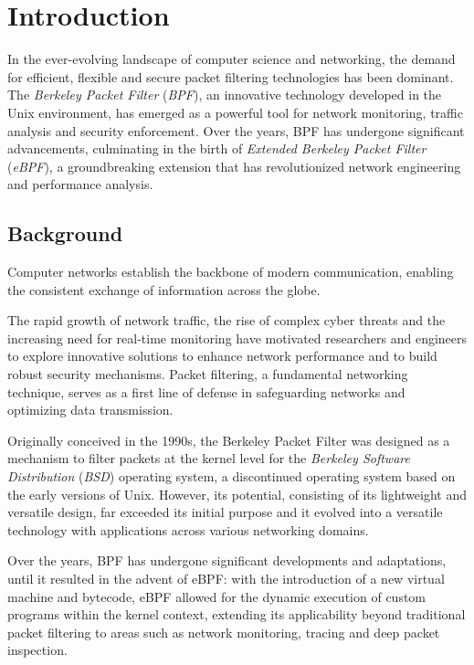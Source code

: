 \chapter{Introduction}

In the ever-evolving landscape of computer science and networking, the demand for efficient, flexible and secure packet filtering technologies has been dominant. 
The \textit{Berkeley Packet Filter} (\textit{BPF}), an innovative technology developed in the Unix environment, has emerged as a powerful tool for network monitoring, traffic analysis and security enforcement. 
Over the years, BPF has undergone significant advancements, culminating in the birth of \textit{Extended Berkeley Packet Filter} (\textit{eBPF}), a groundbreaking extension that has revolutionized network engineering and performance analysis.

\section{Background}

Computer networks establish the backbone of modern communication, enabling the consistent exchange of information across the globe. 

The rapid growth of network traffic, the rise of complex cyber threats and the increasing need for real-time monitoring have motivated researchers and engineers to explore innovative solutions to enhance network performance and to build robust security mechanisms.
Packet filtering, a fundamental networking technique, serves as a first line of defense in safeguarding networks and optimizing data transmission.

Originally conceived in the 1990s, the Berkeley Packet Filter was designed as a mechanism to filter packets at the kernel level for the \textit{Berkeley Software Distribution} (\textit{BSD}) operating system, a discontinued operating system based on the early versions of Unix. 
However, its potential, consisting of its lightweight and versatile design, far exceeded its initial purpose and it evolved into a versatile technology with applications across various networking domains.

Over the years, BPF has undergone significant developments and adaptations, until it resulted in the advent of eBPF: with the introduction of a new virtual machine and bytecode, eBPF allowed for the dynamic execution of custom programs within the kernel context, extending its applicability beyond traditional packet filtering to areas such as network monitoring, tracing and deep packet inspection.

